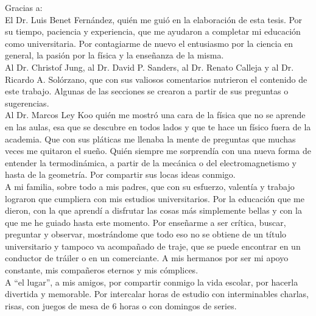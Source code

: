 
\begin{acknowledgements}
Gracias a:\\

El Dr. Luis Benet Fernández, quién me guió en la elaboración de esta tesis. Por su tiempo, paciencia y experiencia, que me ayudaron a completar mi educación como universitaria. Por contagiarme de nuevo el entusiasmo por la ciencia en general, la pasión por la física y la enseñanza de la misma. \\

Al  Dr. Christof Jung, al Dr. David P. Sanders, al Dr. Renato Calleja y al Dr. Ricardo A. Solórzano, que con sus valiosos comentarios nutrieron el contenido de este trabajo. Algunas de las secciones se crearon a partir de sus preguntas o sugerencias. \\

Al Dr. Marcos Ley Koo quién me mostró una cara de la física que no se aprende en las aulas, esa que se descubre en todos lados y que te hace un físico fuera de la academia. Que con sus pláticas me llenaba la mente de preguntas que muchas veces me quitaron el sueño. Quién siempre me sorprendía con una nueva forma de entender la termodinámica, a partir de la mecánica o del electromagnetismo y hasta de la geometría. Por compartir sus locas ideas conmigo. \\

A mi familia, sobre todo a mis padres, que con su esfuerzo, valentía y trabajo lograron que cumpliera con mis estudios universitarios. Por la educación que me dieron, con la que aprendí a disfrutar las cosas más simplemente bellas y con la que me he guiado hasta este momento. Por enseñarme a ser crítica, buscar, preguntar y observar, mostrándome que todo eso no se obtiene de un título universitario y tampoco va acompañado de traje, que se puede encontrar en un conductor de tráiler o en un comerciante. A mis hermanos por ser mi apoyo constante, mis compañeros eternos y mis cómplices.\\

A \textquotedblleft el lugar\textquotedblright, a mis amigos, por compartir conmigo la vida escolar, por hacerla divertida y memorable. Por intercalar horas de estudio con interminables charlas, risas, con juegos de mesa de 6 horas o con domingos de series.\\


\end{acknowledgements}
